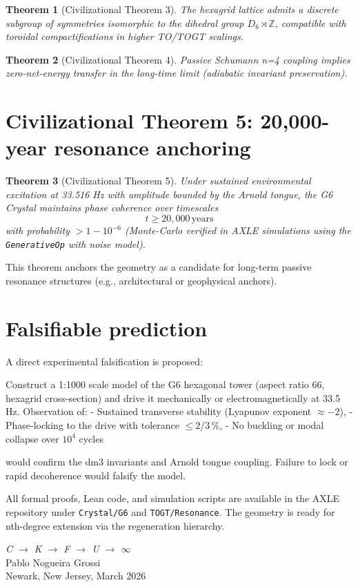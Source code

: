 \documentclass[19pt]{book}
\theoremstyle{plain}
\newtheorem{theorem}{Theorem}[section]
\theoremstyle{definition}
\theoremstyle{remark}
\begin{document}
\begin{theorem}[Civilizational Theorem 3]
The hexagrid lattice admits a discrete subgroup of symmetries isomorphic to the dihedral group $D_6 \rtimes \mathbb{Z}$, compatible with toroidal compactifications in higher TO/TOGT scalings.
\end{theorem}

\begin{theorem}[Civilizational Theorem 4]
Passive Schumann n=4 coupling implies zero-net-energy transfer in the long-time limit (adiabatic invariant preservation).
\end{theorem}

\section{Civilizational Theorem 5: 20,000-year resonance anchoring}

\begin{theorem}[Civilizational Theorem 5]
Under sustained environmental excitation at 33.516 Hz with amplitude bounded by the Arnold tongue, the G6 Crystal maintains phase coherence over timescales
\[
t \ge 20{,}000\,\text{years}
\]
with probability $> 1 - 10^{-6}$ (Monte-Carlo verified in AXLE simulations using the \texttt{GenerativeOp} with noise model).
\end{theorem}

This theorem anchors the geometry as a candidate for long-term passive resonance structures (e.g., architectural or geophysical anchors).

\section{Falsifiable prediction}

A direct experimental falsification is proposed:

Construct a 1:1000 scale model of the G6 hexagonal tower (aspect ratio 66, hexagrid cross-section) and drive it mechanically or electromagnetically at 33.5 Hz. Observation of:
- Sustained transverse stability (Lyapunov exponent $\approx -2$),
- Phase-locking to the drive with tolerance $\le 2/3\,\%$,
- No buckling or modal collapse over $10^4$ cycles

would confirm the dm3 invariants and Arnold tongue coupling. Failure to lock or rapid decoherence would falsify the model.

All formal proofs, Lean code, and simulation scripts are available in the AXLE repository under \texttt{Crystal/G6} and \texttt{TOGT/Resonance}. The geometry is ready for nth-degree extension via the regeneration hierarchy.
\bigskip
\begin{flushright}
\textit{C \;$\to$\; K \;$\to$\; F \;$\to$\; U \;$\to$\; $\infty$}\\[0.3em]
Pablo Nogueira Grossi\\
Newark, New Jersey, March 2026
\end{flushright}
\end{document}
